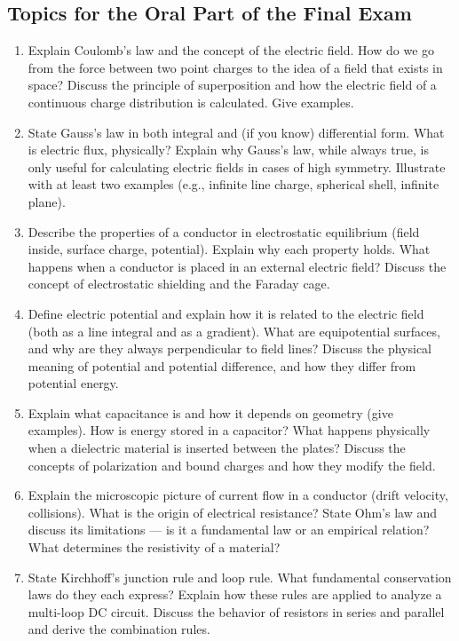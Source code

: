 \documentclass[11pt]{article}
\begin{document}
\subsection*{Topics for the Oral Part of the Final Exam}
\begin{enumerate}
\item Explain Coulomb's law and the concept of the electric field. How do we go from the force between two point charges to the idea of a field that exists in space? Discuss the principle of superposition and how the electric field of a continuous charge distribution is calculated. Give examples.
\item State Gauss's law in both integral and (if you know) differential form. What is electric flux, physically? Explain why Gauss's law, while always true, is only useful for calculating electric fields in cases of high symmetry. Illustrate with at least two examples (e.g., infinite line charge, spherical shell, infinite plane).
\item Describe the properties of a conductor in electrostatic equilibrium (field inside, surface charge, potential). Explain why each property holds. What happens when a conductor is placed in an external electric field? Discuss the concept of electrostatic shielding and the Faraday cage.
\item Define electric potential and explain how it is related to the electric field (both as a line integral and as a gradient). What are equipotential surfaces, and why are they always perpendicular to field lines? Discuss the physical meaning of potential and potential difference, and how they differ from potential energy.
\item Explain what capacitance is and how it depends on geometry (give examples). How is energy stored in a capacitor? What happens physically when a dielectric material is inserted between the plates? Discuss the concepts of polarization and bound charges and how they modify the field.
\item Explain the microscopic picture of current flow in a conductor (drift velocity, collisions). What is the origin of electrical resistance? State Ohm's law and discuss its limitations — is it a fundamental law or an empirical relation? What determines the resistivity of a material?
\item State Kirchhoff's junction rule and loop rule. What fundamental conservation laws do they each express? Explain how these rules are applied to analyze a multi-loop DC circuit. Discuss the behavior of resistors in series and parallel and derive the combination rules.

\end{enumerate}
\end{document}
